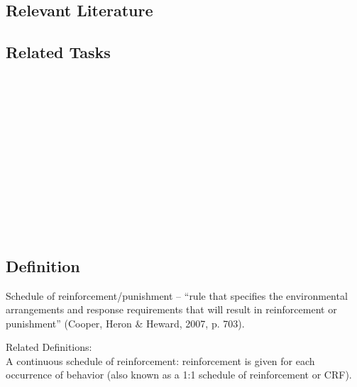 \subsection{Relevant Literature}
\begin{refsection}
\nocite{test,alang2017police,clayton2018black}
\printbibliography[heading=none]
\end{refsection}
%
\subsection{Related Tasks}
\fourcTwo{}\\
\fourdFifteen{}\\
\fourdSixteen{}\\
\fourdSeventeen{}\\
\fourdEighteen{}\\
\fourdNineteen{}\\
\fourFKFourteen{}\\
\fourFKSeventeen{}\\
\fourFKEighteen{}\\
\fourFKNineteen{}\\
\fourFKTwentyOne{}\\
%
%
%
%
%
%
\section{\fourFKTwentyOne{}}
\subsection{Definition}
Schedule of reinforcement/punishment – ``rule that specifies the environmental arrangements and response requirements that will result in reinforcement or punishment'' (Cooper, Heron \& Heward, 2007, p. 703).

Related Definitions:\\

A continuous schedule of reinforcement: reinforcement is given for each occurrence of behavior (also known as a 1:1 schedule of reinforcement or CRF).

